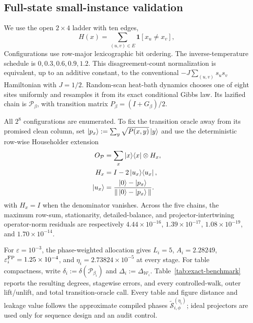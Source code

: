 \documentclass[10pt,conference]{IEEEtran}
\theoremstyle{plain}
\theoremstyle{remark}
\begin{document}
\subsection{Full-state small-instance validation}
\label{sec:numerical-validation}
We use the open \(2\times4\) ladder with ten edges,
\[
H(x)=\sum_{(u,v)\in E}\mathbf 1[x_u\neq x_v],
\]
Configurations use row-major lexicographic bit ordering.  The
inverse-temperature schedule is \(0,0.3,0.6,0.9,1.2\).
This disagreement-count normalization is equivalent, up to an additive constant, to the
conventional \(-J\sum_{(u,v)}s_us_v\) Hamiltonian with \(J=1/2\).
Random-scan heat-bath dynamics chooses one of eight sites uniformly
and resamples it from its exact conditional Gibbs law.  Its lazified
chain is \(\mathcal P_\beta\), with transition matrix
\(P_\beta=(I+G_\beta)/2\).

All \(2^8\) configurations are enumerated.  To fix the transition
oracle away from its promised clean column, set
\(\ket{p_x}:=\sum_y\sqrt{P(x,y)}\ket y\) and use the deterministic
row-wise Householder extension
\begin{equation}
\begin{aligned}
O_{\mathcal P}&=\sum_x\ket x\!\bra x\otimes H_x,\\
H_x&=I-2\ket{u_x}\!\bra{u_x},\\
\ket{u_x}&=\frac{\ket0-\ket{p_x}}
{\|\ket0-\ket{p_x}\|}.
\end{aligned}
\end{equation}
with \(H_x=I\) when the denominator vanishes.  Across the five
chains, the maximum row-sum, stationarity, detailed-balance, and
projector-intertwining operator-norm residuals are respectively
\(4.44\times10^{-16}\), \(1.39\times10^{-17}\),
\(1.08\times10^{-19}\), and \(1.70\times10^{-14}\).

For \(\varepsilon=10^{-3}\), the phase-weighted allocation gives
\(L_i=5\), \(A_i=2.28249\),
\(\varepsilon_i^{\rm FP}=1.25\times10^{-4}\), and
\(\eta_i=2.73824\times10^{-5}\) at every stage.
For table compactness, write
\(\delta_i:=\delta(\mathcal P_{\beta_i})\) and
\(\Delta_i:=\Delta_{\mathcal W_i}\).
Table~\ref{tab:exact-benchmark} reports the resulting degrees,
stagewise errors, and every controlled-walk, outer lift/unlift, and
total transition-oracle call.
Every table and figure distance and leakage value follows the approximate
compiled phases \(\widetilde{\mathcal S}_{i,\phi}^{(\eta_i)}\);
ideal projectors are used only for sequence design and an audit control.


\end{document}
